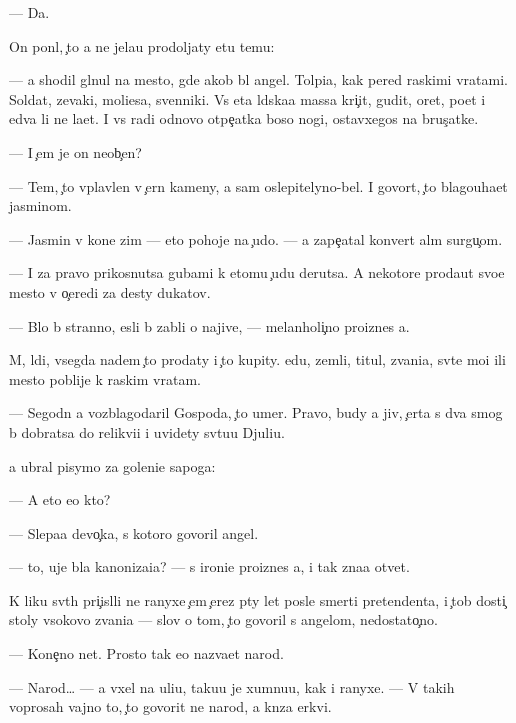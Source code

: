 \documentclass[10pt]{book}
\begin{document}
— Da.

On pon{\ia}l, {\c}to {\y}a ne jela{\y}u prodoljaty etu temu:

— {\Y}a shodil gl{\ia}nul na mesto, gde {\y}akob{\yi} b{\yi}l angel. Tolpi{\x}a, kak pered ra{\y}skimi vratami. Soldat{\yi}, zevaki, mol{\ia}{\x}i{\y}esa, sv{\ia}{\x}enniki. Vs{\ia} eta l{\iu}dska{\y}a massa kri{\c}it, gudit, oret, po{\y}et i {\y}edva li ne la{\y}et. I vs{\e} radi odnovo otpe{\c}atka boso{\y} nogi, ostavxegos{\ia} na brus{\c}atke.

— I {\c}em je on neob{\yi}{\c}en?

— Tem, {\c}to vplavlen v {\c}ern{\yi}{\y} kameny, a sam oslepitelyno-bel. I govor{\ia}t, {\c}to blagouha{\y}et jasminom.

— Jasmin v kon{\q}e zim{\yi} — eto pohoje na {\c}udo. — {\Y}a zape{\c}atal konvert al{\yi}m surgu{\c}om.

— I za pravo prikosnutsa gubami k etomu {\c}udu derutsa. A nekotor{\yi}{\y}e proda{\y}ut svo{\y}e mesto v o{\c}eredi za des{\ia}ty dukatov.

— B{\yi}lo b{\yi} stranno, {\y}esli b{\yi} zab{\yi}li o najive, — melanholi{\c}no pro{\y}iznes {\y}a.

M{\yi}, l{\iu}di, vsegda na{\y}dem {\c}to prodaty i {\c}to kupity. {\Y}edu, zemli, titul{\yi}, zvani{\y}a, sv{\ia}t{\yi}{\y}e mo{\x}i ili mesto poblije k ra{\y}skim vratam.

— Segodn{\ia} {\y}a vozblagodaril Gospoda, {\c}to umer. Pravo, budy {\y}a jiv, {\c}erta s dva smog b{\yi} dobratsa do relikvi{\y}i i uvidety sv{\ia}tu{\y}u Djuli{\y}u.

{\Y}a ubral pisymo za goleni{\x}e sapoga:

— A eto {\y}e{\x}o kto?

— Slepa{\y}a devo{\c}ka, s kotoro{\y} govoril angel.

— {\C}to, uje b{\yi}la kanoniza{\q}i{\y}a? — s ironi{\y}e{\y} pro{\y}iznes {\y}a, i tak zna{\y}a otvet.

K liku sv{\ia}t{\yi}h pri{\c}isl{\ia}li ne ranyxe {\c}em {\c}erez p{\ia}ty let posle smerti pretendenta, i {\c}tob{\yi} dosti{\c} stoly v{\yi}sokovo zvani{\y}a — slov o tom, {\c}to govoril s angelom, nedostato{\c}no.

— Kone{\c}no net. Prosto tak {\y}e{\y}o naz{\yi}va{\y}et narod.

— Narod… — {\Y}a v{\yi}xel na uli{\q}u, taku{\y}u je xumnu{\y}u, kak i ranyxe. — V takih voprosah vajno to, {\c}to govorit ne narod, a kn{\ia}z{\y}a {\q}erkvi.
\end{document}
